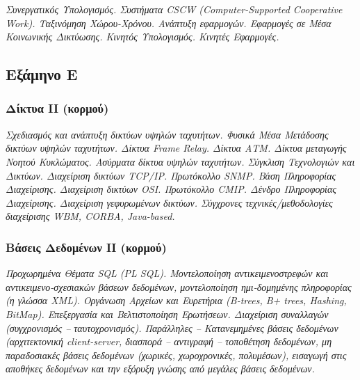 \emph{Συνεργατικός Υπολογισμός. Συστήματα CSCW (Computer-Supported
Cooperative Work). Ταξινόμηση Χώρου-Χρόνου. Ανάπτυξη εφαρμογών.
Εφαρμογές σε Μέσα Κοινωνικής Δικτύωσης. Κινητός Υπολογισμός. Κινητές
Εφαρμογές.}

\hypertarget{ux3b5ux3beux3acux3bcux3b7ux3bdux3bf-ux3b5}{%
\subsection{Εξάμηνο Ε}\label{ux3b5ux3beux3acux3bcux3b7ux3bdux3bf-ux3b5}}

\hypertarget{ux3b4ux3afux3baux3c4ux3c5ux3b1-ii-ux3baux3bfux3c1ux3bcux3bfux3cd}{%
\subsubsection{Δίκτυα II
(κορμού)}\label{ux3b4ux3afux3baux3c4ux3c5ux3b1-ii-ux3baux3bfux3c1ux3bcux3bfux3cd}}

\emph{Σχεδιασμός και ανάπτυξη δικτύων υψηλών ταχυτήτων. Φυσικά Μέσα
Μετάδοσης δικτύων υψηλών ταχυτήτων. Δίκτυα Frame Relay. Δίκτυα ΑΤΜ.
Δίκτυα μεταγωγής Νοητού Κυκλώματος. Ασύρματα δίκτυα υψηλών ταχυτήτων.
Σύγκλιση Τεχνολογιών και Δικτύων. Διαχείριση δικτύων TCP/IP. Πρωτόκολλο
SNMP. Βάση Πληροφορίας Διαχείρισης. Διαχείριση δικτύων OSI. Πρωτόκολλο
CMIP. Δένδρο Πληροφορίας Διαχείρισης. Διαχείριση γεφυρωμένων δικτύων.
Σύγχρονες τεχνικές/μεθοδολογίες διαχείρισης WBM, CORBA, Java-based.}

\hypertarget{ux3b2ux3acux3c3ux3b5ux3b9ux3c2-ux3b4ux3b5ux3b4ux3bfux3bcux3adux3bdux3c9ux3bd-ux3b9ux3b9-ux3baux3bfux3c1ux3bcux3bfux3cd}{%
\subsubsection{Βάσεις Δεδομένων ΙΙ
(κορμού)}\label{ux3b2ux3acux3c3ux3b5ux3b9ux3c2-ux3b4ux3b5ux3b4ux3bfux3bcux3adux3bdux3c9ux3bd-ux3b9ux3b9-ux3baux3bfux3c1ux3bcux3bfux3cd}}

\emph{Προχωρημένα Θέματα SQL (PL SQL). Μοντελοποίηση αντικειμενοστρεφών
και αντικειμενο-σχεσιακών βάσεων δεδομένων, μοντελοποίηση ημι-δομημένης
πληροφορίας (η γλώσσα XML). Οργάνωση Αρχείων και Ευρετήρια (B-trees, B+
trees, Hashing, BitMap). Επεξεργασία και Βελτιστοποίηση Ερωτήσεων.
Διαχείριση συναλλαγών (συγχρονισμός -- ταυτοχρονισμός). Παράλληλες --
Κατανεμημένες βάσεις δεδομένων (αρχιτεκτονική client-server, διασπορά --
αντιγραφή -- τοποθέτηση δεδομένων, μη παραδοσιακές βάσεις δεδομένων
(χωρικές, χωροχρονικές, πολυμέσων), εισαγωγή στις αποθήκες δεδομένων και
την εξόρυξη γνώσης από μεγάλες βάσεις δεδομένων.}

